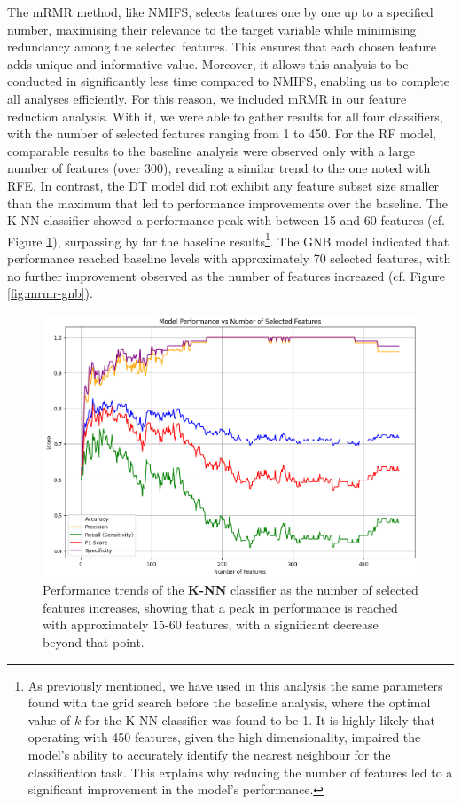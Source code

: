 \documentclass[a4paper, 11pt]{article}
\begin{document}
The mRMR method, like NMIFS, selects features one by one up to a specified number, maximising their relevance to the target variable while minimising redundancy among the selected features. This ensures that each chosen feature adds unique and informative value. Moreover, it allows this analysis to be conducted in significantly less time compared to NMIFS, enabling us to complete all analyses efficiently. For this reason, we included mRMR in our feature reduction analysis. With it, we were able to gather results for all four classifiers, with the number of selected features ranging from 1 to 450. For the RF model, comparable results to the baseline analysis were observed only with a large number of features (over 300), revealing a similar trend to the one noted with RFE. In contrast, the DT model did not exhibit any feature subset size smaller than the maximum that led to performance improvements over the baseline. The K-NN classifier showed a performance peak with between 15 and 60 features (cf. Figure \ref{fig:mrmr-knn}), surpassing by far the baseline results\footnote{As previously mentioned, we have used in this analysis the same parameters found with the grid search before the baseline analysis, where the optimal value of \( k \) for the K-NN classifier was found to be 1. It is highly likely that operating with 450 features, given the high dimensionality, impaired the model’s ability to accurately identify the nearest neighbour for the classification task. This explains why reducing the number of features led to a significant improvement in the model’s performance.}. The GNB model indicated that performance reached baseline levels with approximately 70 selected features, with no further improvement observed as the number of features increased (cf. Figure \ref{fig:mrmr-gnb}).

\begin{figure}[h!]
    \centering
    \includegraphics[width=\textwidth]{Figures/mrmr-knn.png}
    \caption{\footnotesize{Performance trends of the \textbf{K-NN} classifier as the number of selected features increases, showing that a peak in performance is reached with approximately 15-60 features, with a significant decrease beyond that point.}}
    \label{fig:mrmr-knn}
\end{figure}
\end{document}
